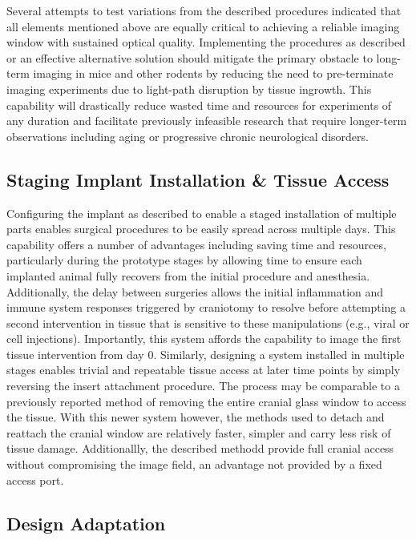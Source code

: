 Several attempts to test variations from the described procedures indicated that all elements mentioned above are equally critical to achieving a reliable imaging window with sustained optical quality. Implementing the procedures as described or an effective alternative solution should mitigate the primary obstacle to long-term imaging in mice and other rodents by reducing the need to pre-terminate imaging experiments due to light-path disruption by tissue ingrowth. This capability will drastically reduce wasted time and resources for experiments of any duration and facilitate previously infeasible research that require longer-term observations including aging or progressive chronic neurological disorders.


\subsection{Staging Implant Installation \& Tissue
Access}\label{staging-implant-installation-tissue-access}

Configuring the implant as described to enable a staged installation of multiple parts enables surgical procedures to be easily spread across multiple days. This capability offers a number of advantages including saving time and resources, particularly during the prototype stages by allowing time to ensure each implanted animal fully recovers from the initial procedure and anesthesia. Additionally, the delay between surgeries allows the initial inflammation and immune system responses triggered by craniotomy to resolve before attempting a second intervention in tissue that is sensitive to these manipulations (e.g., viral or cell injections). Importantly, this system affords the capability to image the first tissue intervention from day 0. 
Similarly, designing a system installed in multiple stages enables trivial and repeatable tissue access at later time points by simply reversing the insert attachment procedure. The process may be comparable to a previously reported method of removing the entire cranial glass window to access the tissue.  With this newer system however, the methods used to detach and reattach the cranial window are relatively faster, simpler and carry less risk of tissue damage. Additionallly, the described methodd provide full cranial access without compromising the image field, an advantage not provided by a fixed access port. 


\subsection{Design Adaptation}\label{design-adaptation}

